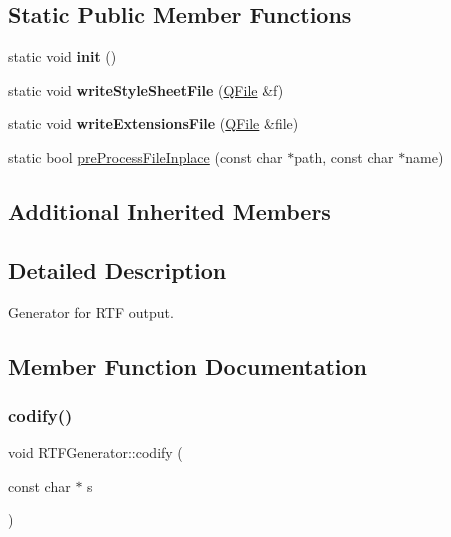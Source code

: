 \subsection*{Static Public Member Functions}
\begin{DoxyCompactItemize}
\item 
\mbox{\label{class_r_t_f_generator_a20ebc13fc3ca037f977dc8144847db73}} 
static void {\bfseries init} ()
\item 
\mbox{\label{class_r_t_f_generator_ace992afab84a2ac7a56ee2b08bff737b}} 
static void {\bfseries write\+Style\+Sheet\+File} (\mbox{\hyperlink{class_q_file}{Q\+File}} \&f)
\item 
\mbox{\label{class_r_t_f_generator_af4a5c00a65aa5e8ba2aab342b171584d}} 
static void {\bfseries write\+Extensions\+File} (\mbox{\hyperlink{class_q_file}{Q\+File}} \&file)
\item 
static bool \mbox{\hyperlink{class_r_t_f_generator_a62498deb4b617b2cfb75381f6508a4ed}{pre\+Process\+File\+Inplace}} (const char $\ast$path, const char $\ast$name)
\end{DoxyCompactItemize}
\subsection*{Additional Inherited Members}


\subsection{Detailed Description}
Generator for R\+TF output. 

\subsection{Member Function Documentation}
\mbox{\label{class_r_t_f_generator_a331ca74e622c48bbbcad7e02139a6bfb}} 
\subsubsection{\texorpdfstring{codify()}{codify()}}
{\footnotesize\ttfamily void R\+T\+F\+Generator\+::codify (\begin{DoxyParamCaption}\item[{const char $\ast$}]{s }\end{DoxyParamCaption})\hspace{0.3cm}{\ttfamily [virtual]}}


